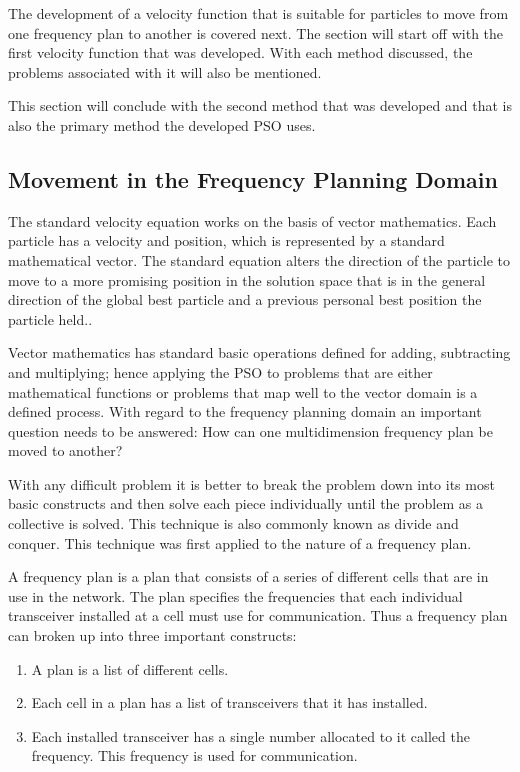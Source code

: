 The development of a velocity function that is suitable for particles to move from one frequency plan to another is covered next. The section will start off with the first velocity function that was developed. With each method discussed, the problems associated with it will also be mentioned. 

This section will conclude with the second method that was developed and that is also the primary method the developed \gls{PSO} uses.

\subsection{Movement in the Frequency Planning Domain}
The standard velocity equation works on the basis of vector mathematics. Each particle has a velocity and position, which is represented by a standard mathematical vector. The standard equation alters the direction of the particle to move to a more promising position in the solution space that is in the general direction of the global best particle and a previous personal best position the particle held..

Vector mathematics has standard basic operations defined for adding, subtracting and multiplying; hence applying the \gls{PSO} to problems that are either mathematical functions or problems that map well to the vector domain is a defined process. With regard to the frequency planning domain an important question needs to be answered: How can one multidimension frequency plan be moved to another?

With any difficult problem it is better to break the problem down into its most basic constructs and then solve each piece individually until the problem as a collective is solved. This technique is also commonly known as divide and conquer. This technique was first applied to the nature of a frequency plan.

A frequency plan is a plan that consists of a series of different cells that are in use in the network. The plan specifies the frequencies that each individual transceiver installed at a cell must use for communication. Thus a frequency plan can broken up into three important constructs:
\begin{enumerate}
\item A plan is a list of different cells.
\item Each cell in a plan has a list of transceivers that it has installed.
\item Each installed transceiver has a single number allocated to it called the frequency. This frequency is used for communication.
\end{enumerate}

